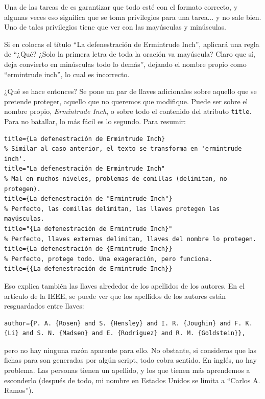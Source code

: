 Una de las tareas de \BibTeX{} es garantizar que todo esté con el formato correcto, y algunas veces eso significa que se toma privilegios para una tarea... y no sale bien. Uno de tales privilegios tiene que ver con las mayúsculas y minúsculas.

Si en \BibTeX{} colocas el título ``La defenestración de Ermintrude Inch'', \BibTeX{} aplicará una regla de ``¿Qué? ¿Solo la primera letra de toda la oración va mayúscula? Claro que sí, deja convierto en minúsculas todo lo demás'', dejando el nombre propio como ``ermintrude inch'', lo cual es incorrecto.

¿Qué se hace entonces? Se pone un par de llaves adicionales sobre aquello que se pretende proteger, aquello que no queremos que \BibTeX{} modifique. Puede ser sobre el nombre propio, \emph{Ermintrude Inch}, o sobre todo el contenido del atributo \texttt{title}. Para no batallar, lo más fácil es lo segundo. Para resumir:

\begin{lstlisting}[style=bibtex]
% Esto está mal, 'Ermintrude Inch' se transforma en 'ermintrude inch'.
title={La defenestración de Ermintrude Inch}
% Similar al caso anterior, el texto se transforma en 'ermintrude inch'.
title="La defenestración de Ermintrude Inch"
% Mal en muchos niveles, problemas de comillas (delimitan, no protegen).
title={La defenestración de "Ermintrude Inch"}
% Perfecto, las comillas delimitan, las llaves protegen las mayúsculas.
title="{La defenestración de Ermintrude Inch}"
% Perfecto, llaves externas delimitan, llaves del nombre lo protegen.
title={La defenestración de {Ermintrude Inch}}
% Perfecto, protege todo. Una exageración, pero funciona.
title={{La defenestración de Ermintrude Inch}}
\end{lstlisting}

Eso explica también las llaves alrededor de los apellidos de los autores. En el artículo de la IEEE, se puede ver que los apellidos de los autores están resguardados entre llaves:

\begin{lstlisting}[style=bibtex]
author={P. A. {Rosen} and S. {Hensley} and I. R. {Joughin} and F. K. {Li} and S. N. {Madsen} and E. {Rodriguez} and R. M. {Goldstein}},
\end{lstlisting}

\noindent pero no hay ninguna razón aparente para ello. No obstante, si consideras que las fichas para \BibTeX{} son generadas por algún script, todo cobra sentido. En inglés, no hay problema. Las personas tienen un apellido, y los que tienen más aprendemos a esconderlo (después de todo, mi nombre en Estados Unidos se limita a ``Carlos A. Ramos'').

